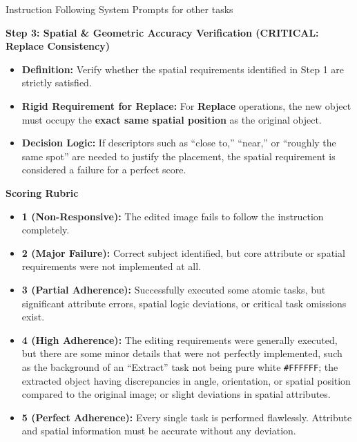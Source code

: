 \documentclass{llmxive}
\begin{document}
\begin{promptbox}[label={System Prompts: IF_other tasks}]{Instruction Following System Prompts for other tasks}
\medskip

\textbf{Step 3: Spatial \& Geometric Accuracy Verification (CRITICAL: Replace Consistency)}

\begin{itemize}[leftmargin=2.2em, labelsep=0.4em, itemsep=2pt]
    \item \textbf{Definition:} Verify whether the spatial requirements identified in Step 1 are strictly satisfied.
    
    \item \textbf{Rigid Requirement for Replace:} For \textbf{Replace} operations, the new object must occupy the \textbf{exact same spatial position} as the original object.
    
    \item \textbf{Decision Logic:} If descriptors such as ``close to,'' ``near,'' or ``roughly the same spot'' are needed to justify the placement, the spatial requirement is considered a failure for a perfect score.
\end{itemize}

\medskip

\textbf{Scoring Rubric}

\begin{itemize}[leftmargin=2.2em, labelsep=0.4em, itemsep=2pt]
    \item \textbf{1 (Non-Responsive):} The edited image fails to follow the instruction completely.
    
    \item \textbf{2 (Major Failure):} Correct subject identified, but core attribute or spatial requirements were not implemented at all.
    
    \item \textbf{3 (Partial Adherence):} Successfully executed some atomic tasks, but significant attribute errors, spatial logic deviations, or critical task omissions exist.
    
    \item \textbf{4 (High Adherence):} The editing requirements were generally executed, but there are some minor details that were not perfectly implemented, such as the background of an ``Extract'' task not being pure white \texttt{\#FFFFFF}; the extracted object having discrepancies in angle, orientation, or spatial position compared to the original image; or slight deviations in spatial attributes.
    
    \item \textbf{5 (Perfect Adherence):} Every single task is performed flawlessly. Attribute and spatial information must be accurate without any deviation.
\end{itemize}


\end{promptbox}
\end{document}
